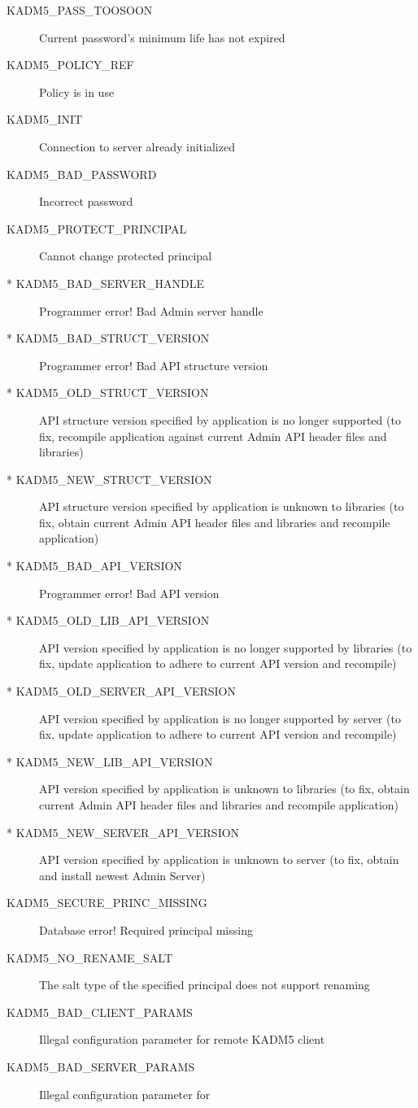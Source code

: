 \begin{description}
\item[KADM5_PASS_TOOSOON] Current password's minimum life has not
expired
\item[KADM5_POLICY_REF] Policy is in use
\item[KADM5_INIT] Connection to server already initialized
\item[KADM5_BAD_PASSWORD] Incorrect password
\item[KADM5_PROTECT_PRINCIPAL] Cannot change protected principal
\item[* KADM5_BAD_SERVER_HANDLE] Programmer error!  Bad Admin server handle
\item[* KADM5_BAD_STRUCT_VERSION] Programmer error!  Bad API structure version
\item[* KADM5_OLD_STRUCT_VERSION] API structure version specified by application is no longer supported (to fix, recompile application against current Admin API header files and libraries)
\item[* KADM5_NEW_STRUCT_VERSION] API structure version specified by application is unknown to libraries (to fix, obtain current Admin API header files and libraries and recompile application)
\item[* KADM5_BAD_API_VERSION] Programmer error!  Bad API version
\item[* KADM5_OLD_LIB_API_VERSION] API version specified by application is no longer supported by libraries (to fix, update application to adhere to current API version and recompile)
\item[* KADM5_OLD_SERVER_API_VERSION] API version specified by application is no longer supported by server (to fix, update application to adhere to current API version and recompile)
\item[* KADM5_NEW_LIB_API_VERSION] API version specified by application is unknown to libraries (to fix, obtain current Admin API header files and libraries and recompile application)
\item[* KADM5_NEW_SERVER_API_VERSION] API version specified by
application is unknown to server (to fix, obtain and install newest
Admin Server)
\item[KADM5_SECURE_PRINC_MISSING] Database error! Required principal missing
\item[KADM5_NO_RENAME_SALT] The salt type of the specified principal
does not support renaming
\item[KADM5_BAD_CLIENT_PARAMS] Illegal configuration parameter for
remote KADM5 client
\item[KADM5_BAD_SERVER_PARAMS] Illegal configuration parameter for

\end{description}
